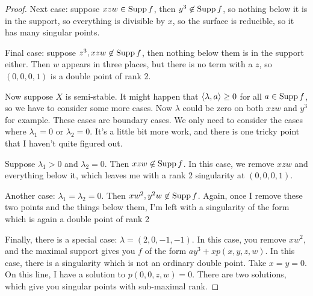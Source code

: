 \begin{proof}
 Next case: suppose $xzw\in \operatorname{Supp} f$, then $y^3\not\in\operatorname{Supp} f$, so nothing below it is in the support, so everything is divisible by $x$, so the surface is reducible, so it has many singular points.
 
 Final case: suppose $z^3,xzw\not\in\operatorname{Supp} f$, then nothing below them is in the support either. Then $w$ appears in three places, but there is no term with a $z$, so $(0,0,0,1)$ is a double point of rank 2.
 
 Now suppose $X$ is semi-stable. It might happen that $\langle\lambda,a\rangle\ge 0$ for all $a\in \operatorname{Supp} f$, so we have to consider some more cases. Now $\lambda$ could be zero on both $xzw$ and $y^3$ for example. These cases are boundary cases. We only need to consider the cases where $\lambda_1=0$ or $\lambda_2=0$. It's a little bit more work, and there is one tricky point that I haven't quite figured out.
 
 Suppose $\lambda_1>0$ and $\lambda_2=0$. Then $xzw\not\in \operatorname{Supp} f$. In this case, we remove $xzw$ and everything below it, which leaves me with a rank 2 singularity at $(0,0,0,1)$.
 
 Another case: $\lambda_1=\lambda_2=0$. Then $xw^2,y^2w\not\in\operatorname{Supp} f$. Again, once I remove these two points and the things below them, I'm left with a singularity of the form \anton{} which is again a double point of rank 2
 
 Finally, there is a special case: $\lambda=(2,0,-1,-1)$. In this case, you remove $xw^2$, and the maximal support gives you $f$ of the form $ay^3+xp(x,y,z,w)$. In this case, there is a singularity which is not an ordinary double point. Take $x=y=0$. On this line, I have a solution to $p(0,0,z,w)=0$. There are two solutions, which give you singular points with sub-maximal rank.
\end{proof}


